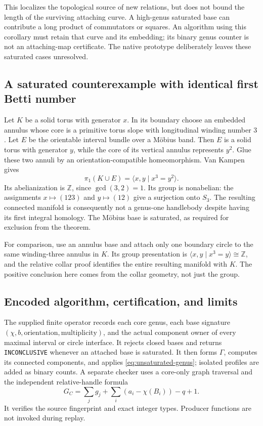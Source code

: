 This localizes the topological source of new relations, but does not
bound the length of the surviving attaching curve.  A high-genus saturated
base can contribute a long product of commutators or squares.  An
algorithm using this corollary must retain that curve and its embedding;
its binary genus counter is not an attaching-map certificate.  The
native prototype deliberately leaves these saturated cases unresolved.

\subsection{A saturated counterexample with identical first Betti number}

Let $K$ be a solid torus with generator $x$.  In its boundary choose an
embedded annulus whose core is a primitive torus slope with longitudinal
winding number $3$.  Let $E$ be the orientable interval bundle over a
M\"obius band.  Then $E$ is a solid torus with generator $y$, while the
core of its vertical annulus represents $y^2$.  Glue these two annuli by
an orientation-compatible homeomorphism.  Van Kampen gives
\[
 \pi_1(K\cup E)=\langle x,y\mid x^3=y^2\rangle.
\]
Its abelianization is $\mathbb Z$, since $\gcd(3,2)=1$.  Its group is
nonabelian: the assignments $x\mapsto(123)$ and $y\mapsto(12)$ give a
surjection onto $S_3$.  The resulting connected manifold is consequently
not a genus-one handlebody despite having its first integral homology.
The M\"obius base is saturated, as required for exclusion from the theorem.

For comparison, use an annulus base and attach only one boundary circle
to the same winding-three annulus in $K$.  Its group presentation is
$\langle x,y\mid x^3=y\rangle\cong\mathbb Z$, and the relative collar
proof identifies the entire resulting manifold with $K$.  The positive
conclusion here comes from the collar geometry, not just the group.

\subsection{Encoded algorithm, certification, and limits}

The supplied finite operator records each core genus, each base signature
$(\chi,b,\text{orientation},\text{multiplicity})$, and the actual component
owner of every maximal interval or circle interface.  It rejects closed
bases and returns \texttt{INCONCLUSIVE} whenever an attached base is
saturated.  It then forms $\Gamma$, computes its connected components,
and applies \eqref{eq:unsaturated-genus}; isolated profiles are added as
binary counts.  A separate checker uses a core-only graph traversal and
the independent relative-handle formula
\[
 G_C=\sum_jg_j+\sum_i(a_i-\chi(B_i))-q+1.
\]
It verifies the source fingerprint and exact integer types.  Producer
functions are not invoked during replay.


